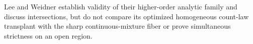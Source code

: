 Lee and Weidner establish validity of their higher-order analytic family and discuss intersections, but do not compare its optimized homogeneous count-law transplant with the sharp continuous-mixture fiber or prove simultaneous strictness on an open region.